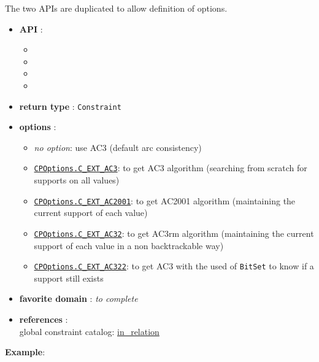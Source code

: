 The two APIs are duplicated to allow definition of options. 
\begin{itemize}
	\item \textbf{API} :
	\begin{itemize}
		\item {}
		\item {}
		\item {}
		\item {}
	\end{itemize}
	\item \textbf{return type} : \texttt{Constraint}
	\item \textbf{options} :
	\begin{itemize}
		\item \emph{no option}: use AC3 (default arc consistency)
		\item \hyperlink{cext3:cext3options}{\tt CPOptions.C\_EXT\_AC3}: to get AC3 algorithm (searching from scratch for supports on all values)
		\item \hyperlink{cext2001:cext2001options}{\tt CPOptions.C\_EXT\_AC2001}: to get AC2001 algorithm (maintaining the current support of each value)
		\item \hyperlink{cext32:cext32options}{\tt CPOptions.C\_EXT\_AC32}: to get AC3rm algorithm (maintaining the current support of each value in a non backtrackable way)
		\item \hyperlink{cext322:cext322options}{\tt CPOptions.C\_EXT\_AC322}: to get AC3 with the used of \texttt{BitSet} to know if a support still exists
	\end{itemize}
	\item \textbf{favorite domain} : \emph{to complete}
	\item \textbf{references} :\\
      global constraint catalog: \href{http://www.emn.fr/x-info/sdemasse/gccat/Cin_relation.html}{in\_relation}
\end{itemize}



\textbf{Example}:
 
